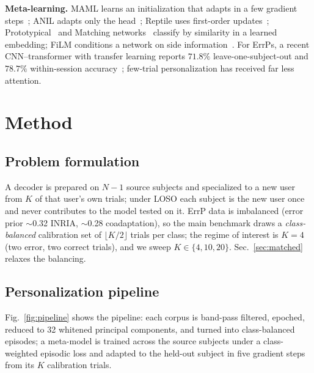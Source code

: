 \documentclass[conference,a4paper]{IEEEtran}
\begin{document}
\textbf{Meta-learning.} MAML learns an initialization that adapts in a few gradient
steps~\cite{finn2017model}; ANIL adapts only the head~\cite{raghu2020rapid}; Reptile
uses first-order updates~\cite{nichol2018first}; Prototypical~\cite{snell2017prototypical}
and Matching networks~\cite{vinyals2016matching} classify by similarity in a learned
embedding; FiLM conditions a network on side information~\cite{perez2018film}. For ErrPs, a recent CNN--transformer with transfer learning reports $71.8\%$ leave-one-subject-out and $78.7\%$ within-session accuracy~\cite{ren2024deep}; few-trial personalization has received far less attention.

\section{Method}

\subsection{Problem formulation}
A decoder is prepared on $N{-}1$ source subjects and specialized to a new user from
$K$ of that user's own trials; under LOSO each subject is the new user once and never
contributes to the model tested on it. ErrP data is imbalanced (error prior
$\sim$0.32 INRIA, $\sim$0.28 coadaptation), so the main benchmark draws a
\emph{class-balanced} calibration set of $\lfloor K/2\rfloor$ trials per class; the
regime of interest is $K{=}4$ (two error, two correct trials), and we sweep
$K\in\{4,10,20\}$. Sec.~\ref{sec:matched} relaxes the balancing.

\subsection{Personalization pipeline}
Fig.~\ref{fig:pipeline} shows the pipeline: each corpus is band-pass filtered,
epoched, reduced to 32 whitened principal components, and turned into class-balanced
episodes; a meta-model is trained across the source subjects under a class-weighted
episodic loss and adapted to the held-out subject in five gradient steps from its $K$
calibration trials.
\end{document}
